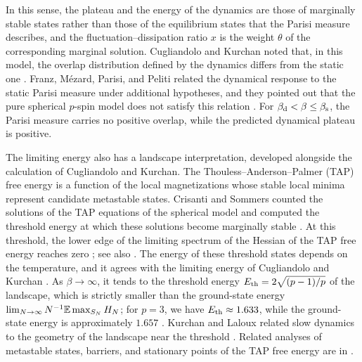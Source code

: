 In this sense, the plateau and the energy of the dynamics are those of marginally stable states rather than those of the equilibrium states that the Parisi measure describes, and the fluctuation--dissipation ratio $x$ is the weight $\theta$ of the corresponding marginal solution. Cugliandolo and Kurchan noted that, in this model, the overlap distribution defined by the dynamics differs from the static one \cite[the paragraph after Equation~(15)]{ck1993}. Franz, M\'ezard, Parisi, and Peliti related the dynamical response to the static Parisi measure under additional hypotheses, and they pointed out that the pure spherical $p$-spin model does not satisfy this relation \cite{fmpp1998}. For $\beta_{\mathrm d}<\beta\le\beta_{\mathrm s}$, the Parisi measure carries no positive overlap, while the predicted dynamical plateau is positive.

The limiting energy also has a landscape interpretation, developed alongside the calculation of Cugliandolo and Kurchan. The Thouless--Anderson--Palmer (TAP) free energy is a function of the local magnetizations whose stable local minima represent candidate metastable states. Crisanti and Sommers counted the solutions of the TAP equations of the spherical model and computed the threshold energy at which these solutions become marginally stable \cite[Equations~(8)--(9)]{cs1995}. At this threshold, the lower edge of the limiting spectrum of the Hessian of the TAP free energy reaches zero \cite[arXiv version~1, p.~4]{ck1993}; see also \cite[arXiv version~2, Section~15.4]{cugliandolo2004}. The energy of these threshold states depends on the temperature, and it agrees with the limiting energy of Cugliandolo and Kurchan \cite[Equation~(14)]{cs1995}. As $\beta\to\infty$, it tends to the threshold energy $E_{\mathrm{th}}=2\sqrt{(p-1)/p}$ of the landscape, which is strictly smaller than the ground-state energy $\lim_{N\to\infty}N^{-1}\mathbb E\max_{S_N}H_N$; for $p=3$, we have $E_{\mathrm{th}}\approx1.633$, while the ground-state energy is approximately $1.657$ \cite{chensen2017}. Kurchan and Laloux related slow dynamics to the geometry of the landscape near the threshold \cite[Section~V]{kurchanlaloux1996}. Related analyses of metastable states, barriers, and stationary points of the TAP free energy are in \cite{kpv1993,cgp1998}.

